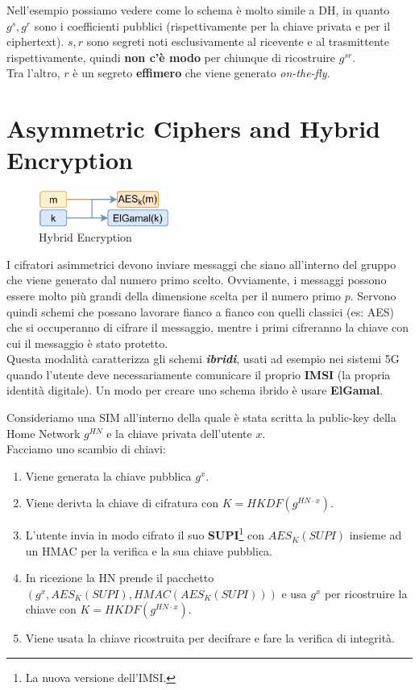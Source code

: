 \begin{note}
Nell'esempio possiamo vedere come lo schema è molto simile a DH, in quanto $g^s,g^r$ sono i coefficienti pubblici (rispettivamente per la chiave privata e per il ciphertext). $s,r$ sono segreti noti esclusivamente al ricevente e al trasmittente rispettivamente, quindi \textbf{non c'è modo} per chiunque di ricostruire $g^{sr}$.\\
Tra l'altro, $r$ è un segreto \textbf{effimero} che viene generato \textit{on-the-fly}.
\end{note}
\section{Asymmetric Ciphers and Hybrid Encryption}
\begin{figure}
\centering
    \includegraphics[width=0.38\textwidth]{image/threshold/hybrid.png}
\caption{Hybrid Encryption}
\label{fig:hybrid}
\end{figure}
I cifratori asimmetrici devono inviare messaggi che siano all'interno del gruppo che viene generato dal numero primo scelto. Ovviamente, i messaggi possono essere molto più grandi della dimensione scelta per il numero primo $p$. Servono quindi schemi che possano lavorare fianco a fianco con quelli classici (es: AES) che si occuperanno di cifrare il messaggio, mentre i primi cifreranno la chiave con cui il messaggio è stato protetto.\\
Questa modalità caratterizza gli schemi \textbf{\textit{ibridi}}, usati ad esempio nei sistemi 5G quando l'utente deve necessariamente comunicare il proprio \textbf{IMSI} (la propria identità digitale). Un modo per creare uno schema ibrido è usare \textbf{ElGamal}.

\begin{example}
Consideriamo una SIM all'interno della quale è stata scritta la public-key della Home Network $g^{HN}$ e la chiave privata dell'utente $x$.\\
Facciamo uno scambio di chiavi:
\begin{enumerate}
    \item Viene generata la chiave pubblica $g^x$.
    \item Viene derivta la chiave di cifratura con $K=HKDF(g^{HN\cdot x})$.
    \item L'utente invia in modo cifrato il suo \textbf{SUPI}\footnote{La nuova versione dell'IMSI.} con $AES_K(SUPI)$ insieme ad un HMAC per la verifica e la sua chiave pubblica.
    \item In ricezione la HN prende il pacchetto $(g^x,AES_K(SUPI),HMAC(AES_K(SUPI)))$ e usa $g^x$ per ricostruire la chiave con $K=HKDF(g^{HN\cdot x})$.
    \item Viene usata la chiave ricostruita per decifrare e fare la verifica di integrità.
\end{enumerate}
\end{example}

